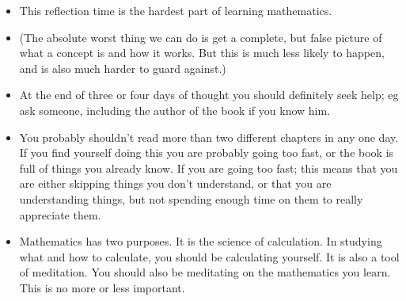 \begin{itemize}
\item
This reflection time is the hardest part of learning mathematics.
\item
(The absolute worst thing we can do is get a complete, but false picture of what a concept is and how it works. But this is much less likely to happen, and is also much harder to guard against.)
\item
At the end of three or four days of thought you should definitely seek help; eg ask someone, including the author of the book if you know him.
\item
You probably shouldn't read more than two different chapters in any one day. If you find yourself doing this you are probably going too fast, or the book is full of things you already know. If you are going too fast; this means that you are either skipping things you don't understand, or that you are understanding things, but not spending enough time on them to really appreciate them.
\item
Mathematics has two purposes. It is the science of calculation. In studying what and how to calculate, you should be calculating yourself. It is also a tool of meditation. You should also be meditating on the mathematics you learn. This is no more or less important. 
\end{itemize}
